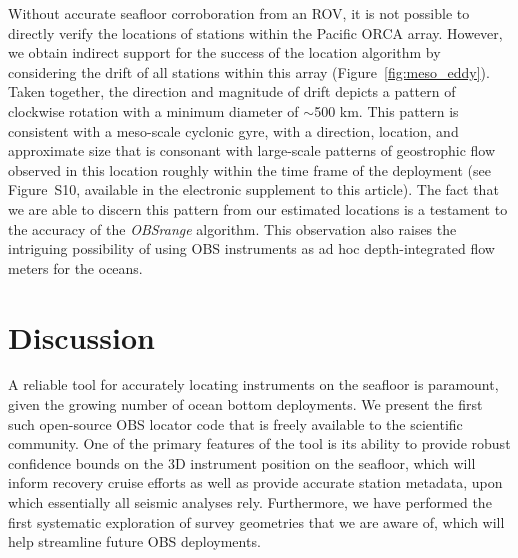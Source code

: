 \documentclass[10pt,titlepage]{article}
\begin{document}
Without accurate seafloor corroboration from an ROV, it is not possible to directly verify the locations of stations within the Pacific ORCA array. However, we  obtain indirect support for the success of the location algorithm by considering the drift of all stations within this array (Figure~\ref{fig:meso_eddy}). Taken together, the direction and magnitude of drift depicts a pattern of clockwise rotation with a minimum diameter of $\sim$500 km. This pattern is consistent with a meso-scale cyclonic gyre, with a direction, location, and approximate size that is consonant with large-scale patterns of geostrophic flow observed in this location roughly within the time frame of the deployment (see Figure~S10, available in the electronic supplement to this article). The fact that we are able to discern this pattern from our estimated locations is a testament to the accuracy of the \textit{OBSrange} algorithm. This observation also raises the intriguing possibility of using OBS instruments as ad hoc depth-integrated flow meters for the oceans. 

\section{Discussion }
A reliable tool for accurately locating instruments on the seafloor is paramount, given the growing number of ocean bottom deployments. We present the first such open-source OBS locator code that is freely available to the scientific community. One of the primary features of the tool is its ability to provide robust confidence bounds on the 3D instrument position on the seafloor, which will inform recovery cruise efforts as well as provide accurate station metadata, upon which essentially all seismic analyses rely. Furthermore, we have performed the first systematic exploration of survey geometries that we are aware of, which will help streamline future OBS deployments.
\end{document}
